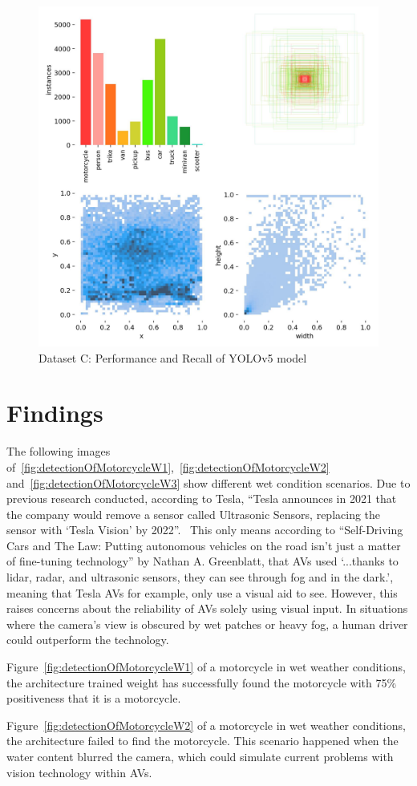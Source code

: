 \documentclass[12pt]{report} %
\begin{document}
		\begin{figure}[hb]
			\centering
			\includegraphics[width=.43\columnwidth]{Figures/dataset_c/labels.jpg}
			\caption{Dataset C: Performance and Recall of YOLOv5 model}
			\label{fig:ntDatasetYolov5MediumWeightLabels}
		\end{figure}

\chapter{Findings}
\label{chap:findings}
	The following images of~\ref{fig:detectionOfMotorcycleW1},~\ref{fig:detectionOfMotorcycleW2} and~\ref{fig:detectionOfMotorcycleW3} show different wet condition scenarios. Due to previous research conducted, according to Tesla, ``Tesla announces in 2021 that the company would remove a sensor called Ultrasonic Sensors, replacing the sensor with `Tesla Vision' by 2022''.~\cite{noauthor_tesla_nodate} This only means according to ``Self-Driving Cars and The Law: Putting autonomous vehicles on the road isn't just a matter of fine-tuning technology'' by Nathan A. Greenblatt, that AVs used `...thanks to lidar, radar, and ultrasonic sensors, they can see through fog and in the dark.', meaning that Tesla AVs for example, only use a visual aid to see. However, this raises concerns about the reliability of AVs solely using visual input. In situations where the camera's view is obscured by wet patches or heavy fog, a human driver could outperform the technology.

	Figure~\ref{fig:detectionOfMotorcycleW1} of a motorcycle in wet weather conditions, the architecture trained weight has successfully found the motorcycle with 75\% positiveness that it is a motorcycle.

	Figure~\ref{fig:detectionOfMotorcycleW2} of a motorcycle in wet weather conditions, the architecture failed to find the motorcycle. This scenario happened when the water content blurred the camera, which could simulate current problems with vision technology within AVs.
\end{document}
